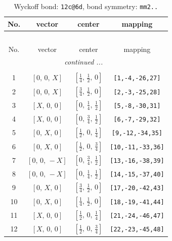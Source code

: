 \documentclass[fleqn,8pt]{jsarticle}
\begin{document}
\renewcommand{\arraystretch}{1.2}
\begin{longtable}{cccc}
\caption{Wyckoff bond: {\tt 12c@6d}, bond symmetry: {\tt mm2..}}
 \\
 \hline \hline
No. & vector & center & mapping \\ \hline \endfirsthead

\multicolumn{3}{l}{\tablename\ \thetable{}} \\
 \hline \hline
No. & vector & center & mapping \\ \hline \endhead

 \hline \hline
\multicolumn{3}{r}{\footnotesize\it continued ...} \\ \endfoot

 \hline \hline
\multicolumn{3}{r}{} \\ \endlastfoot

1 & $\left[ 0,\, 0,\, X \right]$ & $\left[ \frac{1}{4},\, \frac{1}{2},\, 0 \right]$ & {\tt [1,-4,-26,27]} \\ \hline
2 & $\left[ 0,\, 0,\, X \right]$ & $\left[ \frac{3}{4},\, \frac{1}{2},\, 0 \right]$ & {\tt [2,-3,-25,28]} \\ \hline
3 & $\left[ X,\, 0,\, 0 \right]$ & $\left[ 0,\, \frac{1}{4},\, \frac{1}{2} \right]$ & {\tt [5,-8,-30,31]} \\ \hline
4 & $\left[ X,\, 0,\, 0 \right]$ & $\left[ 0,\, \frac{3}{4},\, \frac{1}{2} \right]$ & {\tt [6,-7,-29,32]} \\ \hline
5 & $\left[ 0,\, X,\, 0 \right]$ & $\left[ \frac{1}{2},\, 0,\, \frac{1}{4} \right]$ & {\tt [9,-12,-34,35]} \\ \hline
6 & $\left[ 0,\, X,\, 0 \right]$ & $\left[ \frac{1}{2},\, 0,\, \frac{3}{4} \right]$ & {\tt [10,-11,-33,36]} \\ \hline
7 & $\left[ 0,\, 0,\, - X \right]$ & $\left[ 0,\, \frac{3}{4},\, \frac{1}{2} \right]$ & {\tt [13,-16,-38,39]} \\ \hline
8 & $\left[ 0,\, 0,\, - X \right]$ & $\left[ 0,\, \frac{1}{4},\, \frac{1}{2} \right]$ & {\tt [14,-15,-37,40]} \\ \hline
9 & $\left[ 0,\, X,\, 0 \right]$ & $\left[ \frac{3}{4},\, \frac{1}{2},\, 0 \right]$ & {\tt [17,-20,-42,43]} \\ \hline
10 & $\left[ 0,\, X,\, 0 \right]$ & $\left[ \frac{1}{4},\, \frac{1}{2},\, 0 \right]$ & {\tt [18,-19,-41,44]} \\ \hline
11 & $\left[ X,\, 0,\, 0 \right]$ & $\left[ \frac{1}{2},\, 0,\, \frac{1}{4} \right]$ & {\tt [21,-24,-46,47]} \\ \hline
12 & $\left[ X,\, 0,\, 0 \right]$ & $\left[ \frac{1}{2},\, 0,\, \frac{3}{4} \right]$ & {\tt [22,-23,-45,48]} \\
\end{longtable}
\end{document}
